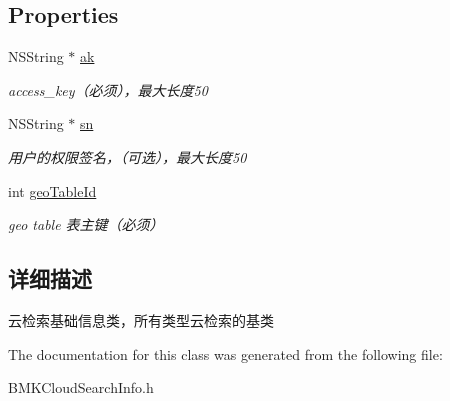\subsection*{Properties}
\begin{DoxyCompactItemize}
\item 
\hypertarget{interface_b_m_k_base_cloud_search_info_a3ac025d61069505d4ff685e4c77b78a4}{N\-S\-String $\ast$ \hyperlink{interface_b_m_k_base_cloud_search_info_a3ac025d61069505d4ff685e4c77b78a4}{ak}}\label{interface_b_m_k_base_cloud_search_info_a3ac025d61069505d4ff685e4c77b78a4}

\begin{DoxyCompactList}\small\item\em access\-\_\-key（必须），最大长度50 \end{DoxyCompactList}\item 
\hypertarget{interface_b_m_k_base_cloud_search_info_a0dcbea8108d264a217566025d43aff12}{N\-S\-String $\ast$ \hyperlink{interface_b_m_k_base_cloud_search_info_a0dcbea8108d264a217566025d43aff12}{sn}}\label{interface_b_m_k_base_cloud_search_info_a0dcbea8108d264a217566025d43aff12}

\begin{DoxyCompactList}\small\item\em 用户的权限签名，（可选），最大长度50 \end{DoxyCompactList}\item 
\hypertarget{interface_b_m_k_base_cloud_search_info_acb6f48270abf3f46a0412bcd658d099c}{int \hyperlink{interface_b_m_k_base_cloud_search_info_acb6f48270abf3f46a0412bcd658d099c}{geo\-Table\-Id}}\label{interface_b_m_k_base_cloud_search_info_acb6f48270abf3f46a0412bcd658d099c}

\begin{DoxyCompactList}\small\item\em geo table 表主键（必须） \end{DoxyCompactList}\end{DoxyCompactItemize}


\subsection{详细描述}
云检索基础信息类，所有类型云检索的基类 

The documentation for this class was generated from the following file\-:\begin{DoxyCompactItemize}
\item 
B\-M\-K\-Cloud\-Search\-Info.\-h\end{DoxyCompactItemize}
